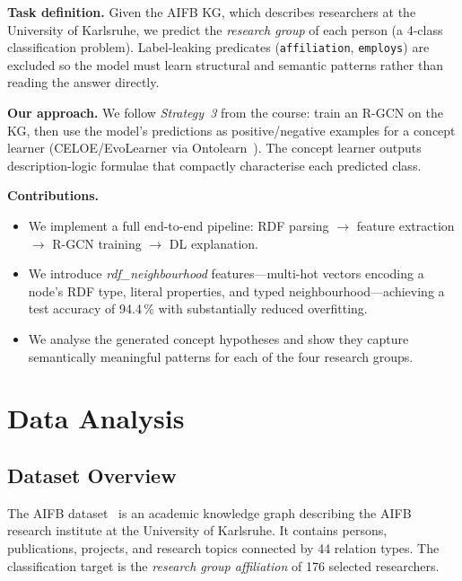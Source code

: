\documentclass[runningheads]{llncs}
\begin{document}
\textbf{Task definition.}
Given the AIFB KG, which describes researchers at the University of Karlsruhe, we predict the
\emph{research group} of each person (a 4-class classification problem).
Label-leaking predicates (\texttt{affiliation}, \texttt{employs}) are excluded so the model must
learn structural and semantic patterns rather than reading the answer directly.

\textbf{Our approach.}
We follow \emph{Strategy~3} from the course: train an R-GCN on the KG, then use the model's
predictions as positive/negative examples for a concept learner
(CELOE/EvoLearner via Ontolearn~\cite{ontolearn2023}).
The concept learner outputs description-logic formulae that compactly characterise each predicted
class.

\textbf{Contributions.}
\begin{itemize}
    \item We implement a full end-to-end pipeline:
          RDF parsing $\to$ feature extraction $\to$ R-GCN training $\to$ DL explanation.
    \item We introduce \emph{rdf\_neighbourhood} features---multi-hot vectors encoding a node's
          RDF type, literal properties, and typed neighbourhood---achieving a test accuracy of
          94.4\,\% with substantially reduced overfitting.
    \item We analyse the generated concept hypotheses and show they capture semantically meaningful
          patterns for each of the four research groups.
\end{itemize}

\section{Data Analysis}

\subsection{Dataset Overview}

The AIFB dataset~\cite{bloehdorn2007} is an academic knowledge graph describing the AIFB research
institute at the University of Karlsruhe.
It contains persons, publications, projects, and research topics connected by 44 relation types.
The classification target is the \emph{research group affiliation} of 176 selected researchers.
\end{document}
